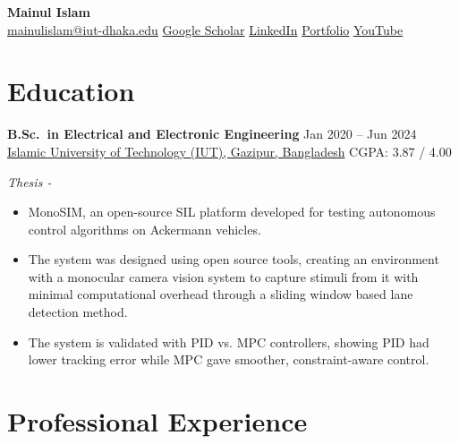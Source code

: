 \documentclass[10pt]{article}
\begin{document}
\begin{center}
    {\LARGE\bfseries Mainul Islam}\\[3pt]
    \href{mailto:mainulislam@iut-dhaka.edu}{mainulislam@iut-dhaka.edu} \;\textbar\;
    \href{https://scholar.google.com/citations?user=mHfGHugAAAAJ\&hl=en}{Google Scholar} \;\textbar\;
    \href{https://www.linkedin.com/in/mainul-islam-254071205/}{LinkedIn} \;\textbar\;
    \href{https://mainul-islam-07.github.io/mainulislam.github.io/}{Portfolio} \;\textbar\;
    \href{https://www.youtube.com/@mainulislamefan}{YouTube}
\end{center}

\section*{Education}
\textbf{B.Sc.\ in Electrical and Electronic Engineering} \hfill Jan 2020 -- Jun 2024\\
\href{https://www.iutoic-dhaka.edu/}{Islamic University of Technology (IUT), Gazipur, Bangladesh}
\hfill CGPA: 3.87 / 4.00

\smallskip
\textit{Thesis -} 
\begin{itemize}
    \item MonoSIM, an open-source SIL platform developed for testing autonomous control algorithms on Ackermann vehicles.
    \item  The system was designed using open source tools, creating an environment with a monocular camera vision system to capture stimuli from it with minimal computational overhead through a sliding window based lane detection method.
    \item The system is validated with PID vs. MPC controllers, showing PID had lower tracking error while MPC gave smoother, constraint-aware control.
\end{itemize}


\section*{Professional Experience}
\end{document}
